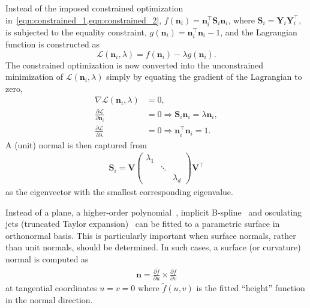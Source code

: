 Instead of the imposed constrained optimization in~\cref{eqn:constrained_1,eqn:constrained_2}, $f(\mathbf{n}_i) = \mathbf{n}_i^\intercal \mathbf{S}_i \mathbf{n}_i$, where $\mathbf{S}_i = \mathbf{Y}_i \mathbf{Y}_i^\intercal$, is subjected to the equality constraint, $g(\mathbf{n}_i) = \mathbf{n}_i^\intercal \mathbf{n}_i - 1$, and the Lagrangian function is constructed as
\begin{equation*}
    \mathcal{L}(\mathbf{n}_i, \lambda) = f(\mathbf{n}_i) - \lambda g(\mathbf{n}_i).
\end{equation*}
The constrained optimization is now converted into the unconstrained minimization of $\mathcal{L}(\mathbf{n}_i, \lambda)$ simply by equating the gradient of the Lagrangian to zero,
\begin{align}
    \nabla \mathcal{L}(\mathbf{n}_i, \lambda) &= 0, \\
    \frac{\partial \mathcal{L}}{\partial \mathbf{n}_i} &= 0 \Rightarrow \mathbf{S}_i \mathbf{n}_i = \lambda \mathbf{n}_i, \\
    \frac{\partial \mathcal{L}}{\partial \lambda} &= 0 \Rightarrow \mathbf{n}_i^\intercal \mathbf{n}_i = 1.
\end{align}
A (unit) normal is then captured from
\begin{align}
    \mathbf{S}_i = \mathbf{V} \begin{pmatrix}
    \lambda_1 &  &  \\
    & \ddots & \\
    & & \lambda_d
    \end{pmatrix} \boldsymbol{V}^\intercal
\end{align}
as the eigenvector with the smallest corresponding eigenvalue.

Instead of a plane, a higher-order polynomial~\cite{Levin1998approximation}, implicit B-spline~\cite{Rouhani2015Implicit} and osculating jets (truncated Taylor expansion)~\cite{Cazals2005Estimating} can be fitted to a parametric surface in orthonormal basis.   
This is particularly important when surface normals, rather than unit normals, should be determined.
In such cases, a surface (or curvature) normal is computed as
\begin{align}
    \mathbf{n} = \frac{\partial \tilde f}{\partial u} \times \frac{\partial \tilde f}{\partial v}
\end{align}
at tangential coordinates $u = v = 0$ where $\tilde{f}(u, v)$ is the fitted ``height'' function in the normal direction.

